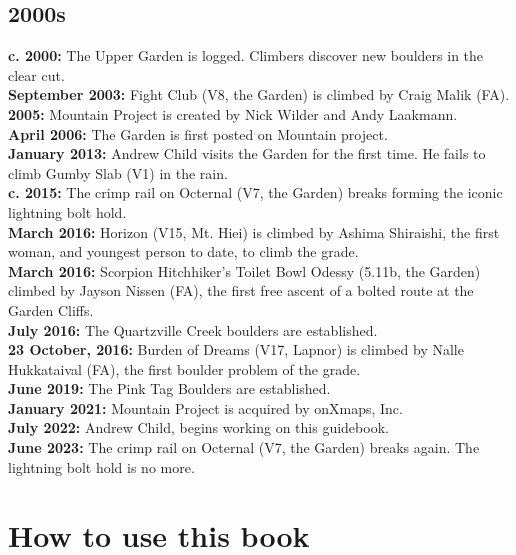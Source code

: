 \subsection*{2000s}
\colorbox{green!20}{\textbf{c. 2000:}} The Upper Garden is logged. Climbers discover new boulders in the clear cut.\\
\colorbox{green!20}{\textbf{September 2003:}} Fight Club (V8, the Garden) is climbed by Craig Malik (FA).\\
\colorbox{red!20}{\textbf{2005:}} Mountain Project is created by Nick Wilder and Andy Laakmann.\\
\colorbox{green!20}{\textbf{April 2006:}} The Garden is first posted on Mountain project.\\
\colorbox{green!20}{\textbf{ January 2013:}} Andrew Child visits the Garden for the first time. He fails to climb Gumby Slab (V1) in the rain.\\
\colorbox{RoyalBlue!20}{\textbf{c. 2015:}} The crimp rail on Octernal (V7, the Garden) breaks forming the iconic lightning bolt hold.\\
\colorbox{red!20}{\textbf{March 2016:}} Horizon (V15, Mt. Hiei) is climbed by Ashima Shiraishi, the first woman, and youngest person to date, to climb the grade.\\
\colorbox{green!20}{\textbf{March 2016:}} Scorpion Hitchhiker's Toilet Bowl Odessy (5.11b, the Garden) climbed by Jayson Nissen (FA), the first free ascent of a bolted route at the Garden Cliffs.\\
\colorbox{green!20}{\textbf{July 2016:}} The Quartzville Creek boulders are established.\\
\colorbox{red!20}{\textbf{23 October, 2016:}} Burden of Dreams (V17, Lapnor) is climbed by Nalle Hukkataival (FA), the first boulder problem of the grade.\\
\colorbox{green!20}{\textbf{June 2019:}} The Pink Tag Boulders are established.\\
\colorbox{red!20}{\textbf{January 2021:}} Mountain Project is acquired by onXmaps, Inc.\\
\colorbox{green!20}{\textbf{July 2022:}} Andrew Child, begins working on this guidebook.\\
\colorbox{RoyalBlue!20}{\textbf{June 2023:}} The crimp rail on Octernal (V7, the Garden) breaks again. The lightning bolt hold is no more.\\
\newpage

\section{How to use this book}
